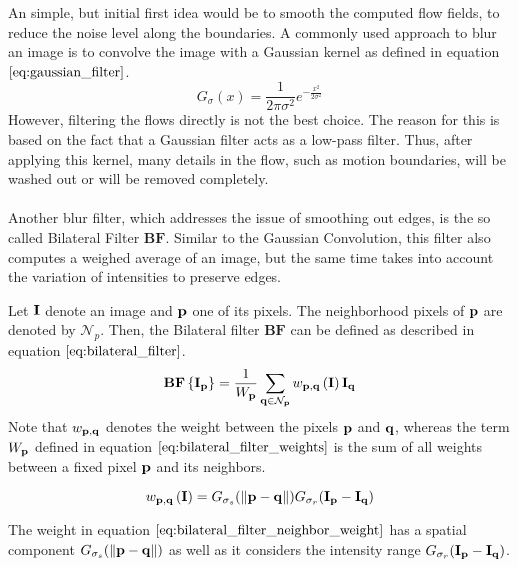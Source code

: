 An simple, but initial first idea would be to smooth the computed flow fields, to reduce the noise level along the boundaries. A commonly used approach to blur an image is to convolve the image with a Gaussian kernel as defined in equation $\ref{eq:gaussian_filter}$.
\begin{equation}
	G_{\sigma}\left( x \right) = \frac{1}{2 \pi \sigma^2} e^{-\frac{x^2}{2 \sigma^2}}
\label{eq:gaussian_filter}
\end{equation}
However, filtering the flows directly is not the best choice. The reason for this is based on the fact that a Gaussian filter acts as a low-pass filter. Thus, after applying this kernel, many details in the flow, such as motion boundaries, will be washed out or will be removed completely. \\ \\
Another blur filter, which addresses the issue of smoothing out edges, is the so called Bilateral Filter $\textbf{BF}$. Similar to the Gaussian Convolution, this filter also computes a weighed average of an image, but the same time takes into account the variation of intensities to preserve edges. 

Let $\bf{I}$ denote an image and $\bf{p}$ one of its pixels. The neighborhood pixels of $\bf{p}$ are denoted by $\mathcal{N}_p$. Then, the Bilateral filter $\textbf{BF}$ can be defined as described in equation $\ref{eq:bilateral_filter}$.
\begin{equation}
	\textbf{BF} \left\{ \bf{I}_{\bf{p}} \right\} = \frac{1}{W_{\bf{p}}} \sum_{\bf{q} \in \mathcal{N}_p} w_{\bf{p}, \bf{q}} \left( \bf{I} \right) \bf{I}_{\bf{q}}
\label{eq:bilateral_filter}
\end{equation}
Note that $w_{\bf{p}, \bf{q}}$ denotes the weight between the pixels $\bf{p}$ and $\bf{q}$, whereas the term $W_{\bf{p}}$ defined in equation $\ref{eq:bilateral_filter_weights}$ is the sum of all weights between a fixed pixel $\bf{p}$ and its neighbors.

\begin{equation}
	w_{\bf{p}, \bf{q}} \left( \bf{I} \right) = G_{\sigma_s} (\left\lVert\bf{p} - \bf{q}\right\rVert) G_{\sigma_r} (\bf{I}_{\bf{p}} - \bf{I}_{\bf{q}}) 
\label{eq:bilateral_filter_neighbor_weight}
\end{equation}

The weight in equation $\ref{eq:bilateral_filter_neighbor_weight}$ has a spatial component $G_{\sigma_s} (\left\lVert\bf{p} - \bf{q}\right\rVert)$ as well as it considers the intensity range $G_{\sigma_r} (\bf{I}_{\bf{p}} - \bf{I}_{\bf{q}})$.

